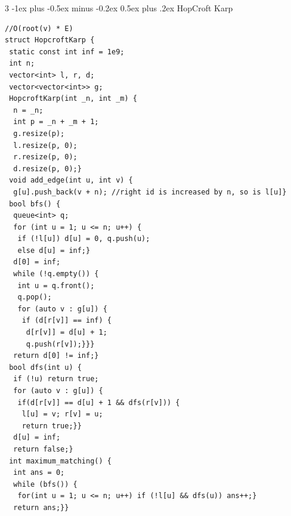 \documentclass[8pt,a4paper,onesided]{article}
\makeatletter
\renewcommand{\subsection}{\@startsection{subsection}{2}{0mm}
    {-1ex plus -0.5ex minus -0.2ex} %
    {0.5ex plus .2ex}                %
    {\normalfont\large\bfseries}}    %
\makeatother
\begin{document}
\begin{multicols}{3}
\subsection{HopCroft Karp}
\begin{verbatim}
//O(root(v) * E)
struct HopcroftKarp {
 static const int inf = 1e9;
 int n;
 vector<int> l, r, d;
 vector<vector<int>> g;
 HopcroftKarp(int _n, int _m) {
  n = _n;
  int p = _n + _m + 1;
  g.resize(p);
  l.resize(p, 0);
  r.resize(p, 0);
  d.resize(p, 0);}
 void add_edge(int u, int v) {
  g[u].push_back(v + n); //right id is increased by n, so is l[u]}
 bool bfs() {
  queue<int> q;
  for (int u = 1; u <= n; u++) {
   if (!l[u]) d[u] = 0, q.push(u);
   else d[u] = inf;}
  d[0] = inf;
  while (!q.empty()) {
   int u = q.front();
   q.pop();
   for (auto v : g[u]) {
    if (d[r[v]] == inf) {
     d[r[v]] = d[u] + 1;
     q.push(r[v]);}}}
  return d[0] != inf;}
 bool dfs(int u) {
  if (!u) return true;
  for (auto v : g[u]) {
   if(d[r[v]] == d[u] + 1 && dfs(r[v])) {
    l[u] = v; r[v] = u;
    return true;}}
  d[u] = inf;
  return false;}
 int maximum_matching() {
  int ans = 0;
  while (bfs()) {
   for(int u = 1; u <= n; u++) if (!l[u] && dfs(u)) ans++;}
  return ans;}}
\end{verbatim}

\end{multicols}
\end{document}
